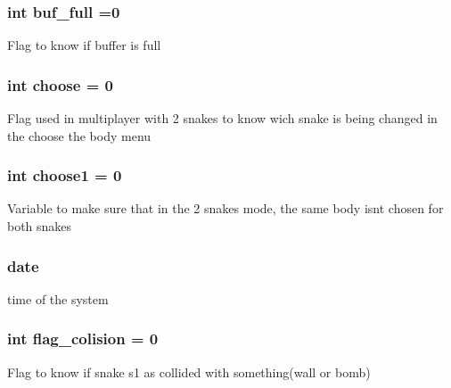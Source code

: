 \subsubsection[{\texorpdfstring{buf\+\_\+full}{buf_full}}]{\setlength{\rightskip}{0pt plus 5cm}int buf\+\_\+full =0\hspace{0.3cm}{\ttfamily [static]}}\hypertarget{group__man__events_ga45b2c3de13c3743778747ed17bd97be6}{}\label{group__man__events_ga45b2c3de13c3743778747ed17bd97be6}
Flag to know if buffer is full 
\subsubsection[{\texorpdfstring{choose}{choose}}]{\setlength{\rightskip}{0pt plus 5cm}int choose = 0\hspace{0.3cm}{\ttfamily [static]}}\hypertarget{group__man__events_ga382290cee9798b0d650c1f2fb55de1d4}{}\label{group__man__events_ga382290cee9798b0d650c1f2fb55de1d4}
Flag used in multiplayer with 2 snakes to know wich snake is being changed in the choose the body menu 
\subsubsection[{\texorpdfstring{choose1}{choose1}}]{\setlength{\rightskip}{0pt plus 5cm}int choose1 = 0\hspace{0.3cm}{\ttfamily [static]}}\hypertarget{group__man__events_ga11ede57042994849c9753d651a6c31f0}{}\label{group__man__events_ga11ede57042994849c9753d651a6c31f0}
Variable to make sure that in the 2 snakes mode, the same body isnt chosen for both snakes 
\subsubsection[{\texorpdfstring{date}{date}}]{ date}\hypertarget{group__man__events_gaa68c2949762722dfdaa5fa0e70d23cec}{}\label{group__man__events_gaa68c2949762722dfdaa5fa0e70d23cec}
time of the system 
\subsubsection[{\texorpdfstring{flag\+\_\+colision}{flag_colision}}]{\setlength{\rightskip}{0pt plus 5cm}int flag\+\_\+colision = 0\hspace{0.3cm}{\ttfamily [static]}}\hypertarget{group__man__events_ga4cf8437a340f1c3bc00642b3f4fb96ae}{}\label{group__man__events_ga4cf8437a340f1c3bc00642b3f4fb96ae}
Flag to know if snake s1 as collided with something(wall or bomb) 
